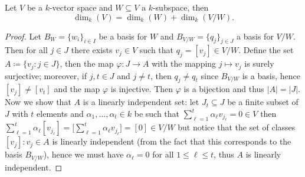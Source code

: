 \begin{lemma}\label{lem: rank plus nullity lemma}
    Let \(V\) be a \(k\)-vector space and \(W \subseteq V\) a \(k\)-subspace, then
    \[
        \dim_k(V) = \dim_k(W) + \dim_k(V/W).
    \]
\end{lemma}

\begin{proof}
    Let \(B_W = \{w_i\}_{i \in I}\) be a basis for \(W\) and  \(B_{V/W} =
    \{q_j\}_{j \in J}\) a basis for \(V/W\). Then for all \(j \in J\) there exists \(v_j
    \in V\) such that \(q_j = [v_j] \in V/W\). Define the set \(A \coloneq \{v_j \colon j \in J\}\),
    then the map \(\varphi : J \to A\) with the mapping \(j \mapsto v_j\) is
    surely surjective; moreover, if \(j, t \in J\) and  \(j \neq t\), then \(q_j
    \neq q_t\) since \(B_{V/W}\) is a basis, hence \([v_j] \neq [v_t]\) and the
    map \(\varphi\) is injective. Then \(\varphi\) is a bijection and thus \(|A| =
    |J|\). Now we show that \(A\) is a linearly independent set: let \(J_t
    \subseteq J\) be a finite subset of \(J\) with \(t\) elements and \(\alpha_1,
    \dots, \alpha_t \in k\) be such that \(\sum_{\ell=1}^t \alpha_\ell v_{j_\ell}
    = 0 \in V\) then \(\sum_{\ell=1}^t \alpha_\ell [v_{j_\ell}] = \big[
        \sum_{\ell=1}^t \alpha_\ell v_{j_\ell} \big] = [0] \in V/W\) but notice that
    the set of classes \([v_j] : v_j \in A\) is linearly independent (from the
    fact that this corresponds to the basis \(B_{V/W}\)), hence we must have
    \(\alpha_\ell = 0\) for all \(1 \leq \ell \leq t\), thus \(A\) is linearly
    independent.


\end{proof}
